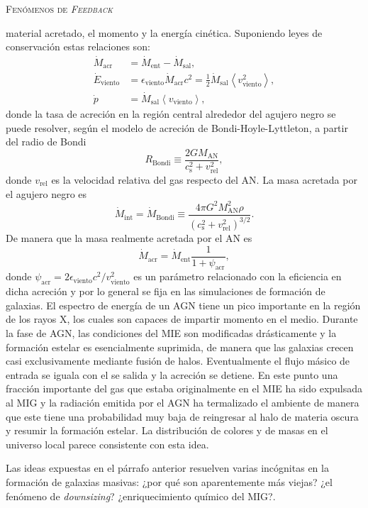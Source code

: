 \documentclass[xcolor=dvipsnames,4pt,hyperref={colorlinks,citecolor=black,linkcolor=black,urlcolor=black}]{beamer}
\begin{document}
\begin{frame}[allowframebreaks]{\textsc{Fenómenos de \emph{Feedback}}}
\begin{description}
material acretado, el momento y la energía cinética. Suponiendo leyes de conservación estas
relaciones son:
%
\begin{align}
\dot{M}_\text{acr}    &= \dot{M}_\text{ent} - \dot{M}_\text{sal}, \nonumber\\
\dot{E}_\text{viento} &= \epsilon_\text{viento}\dot{M}_\text{acr}c^2 = \frac{1}{2}\dot{M}_\text{sal}\left<v_\text{viento}^2\right>, \nonumber\\
\dot{p}               &= \dot{M}_\text{sal}\left<v_\text{viento}\right>, \nonumber
\end{align}
%
donde la tasa de acreción en la región central alrededor del agujero negro se puede resolver, según
el modelo de acreción de Bondi-Hoyle-Lyttleton, a partir del radio de Bondi
%
$$
R_\text{Bondi} \equiv \frac{2GM_\text{AN}}{c_\text{s}^2 + v_\text{rel}^2},
$$
%
donde $v_\text{rel}$ es la velocidad relativa del gas respecto del AN. La masa acretada por el
agujero negro es
%
$$
\dot{M}_\text{int} = \dot{M}_\text{Bondi} \equiv \frac{4\pi G^2M_\text{AN}^2\rho}{\left(c_\text{s}^2 + v_\text{rel}^2\right)^{3/2}}.
$$
%
De manera que la masa realmente acretada por el AN es
%
$$
\dot{M}_\text{acr} = \dot{M}_\text{ent}\frac{1}{1+\psi_\text{acr}},
$$
%
donde $\psi_\text{acr} = 2\epsilon_\text{viento}c^2/v_\text{viento}^2$ es un parámetro relacionado
con la eficiencia en dicha acreción y por lo general se fija en las simulaciones de formación de
galaxias.
%
%
El espectro de energía de un AGN tiene un pico importante en la región de los rayos X, los cuales
son capaces de impartir momento en el medio. Durante la fase de AGN, las condiciones del MIE son
modificadas drásticamente y la formación estelar es esencialmente suprimida, de manera que las
galaxias crecen casi exclusivamente mediante fusión de halos. Eventualmente el flujo másico de
entrada se iguala con el se salida y la acreción se detiene. En este punto una fracción importante
del gas que estaba originalmente en el MIE ha sido expulsada al MIG y la radiación emitida por el
AGN ha termalizado el ambiente de manera que este tiene una probabilidad muy baja de reingresar al
halo de materia oscura y resumir la formación estelar. La distribución de colores y de masas en el
universo local parece consistente con esta idea.

Las ideas expuestas en el párrafo anterior resuelven varias incógnitas en la formación de galaxias
masivas: ¿por qué son aparentemente más viejas? ¿el fenómeno de \emph{downsizing}? ¿enriquecimiento
químico del MIG?.
%
\end{description}
%
\end{frame}
\end{document}

